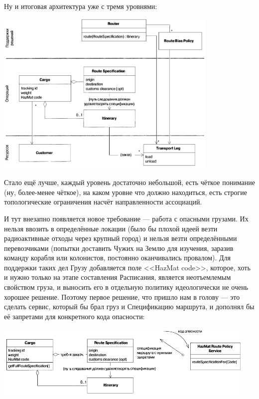 \documentclass{../../text-style}
\begin{document}
Ну и итоговая архитектура уже с тремя уровнями:

\begin{center}
    \includegraphics[width=0.8\textwidth]{cargoThreeLayers.png}
\end{center}

Стало ещё лучше, каждый уровень достаточно небольшой, есть чёткое понимание (ну, более-менее чёткое), на каком уровне что должно находиться, есть строгие топологические ограничения насчёт направленности ассоциаций.

И тут внезапно появляется новое требование --- работа с опасными грузами. Их нельзя ввозить в определённые локации (было бы плохой идеей везти радиоактивные отходы через крупный город) и нельзя везти определёнными перевозчиками (попытки доставить Чужих на Землю для изучения, заразив команду корабля или колонистов, постоянно оканчивались провалом). Для поддержки таких дел Грузу добавляется поле <<HazMat code>>, которое, хоть и нужно только на этапе составления Расписания, является неотъемлемым свойством груза, и выносить его в отдельную политику идеологически не очень хорошее решение. Поэтому первое решение, что пришло нам в голову --- это сделать сервис, который бы брал груз и Спецификацию маршрута, и дополнял бы её запретами для конкретного кода опасности:

\begin{center}
    \includegraphics[width=0.95\textwidth]{cargoHazMatWrong.png}
\end{center}
\end{document}
